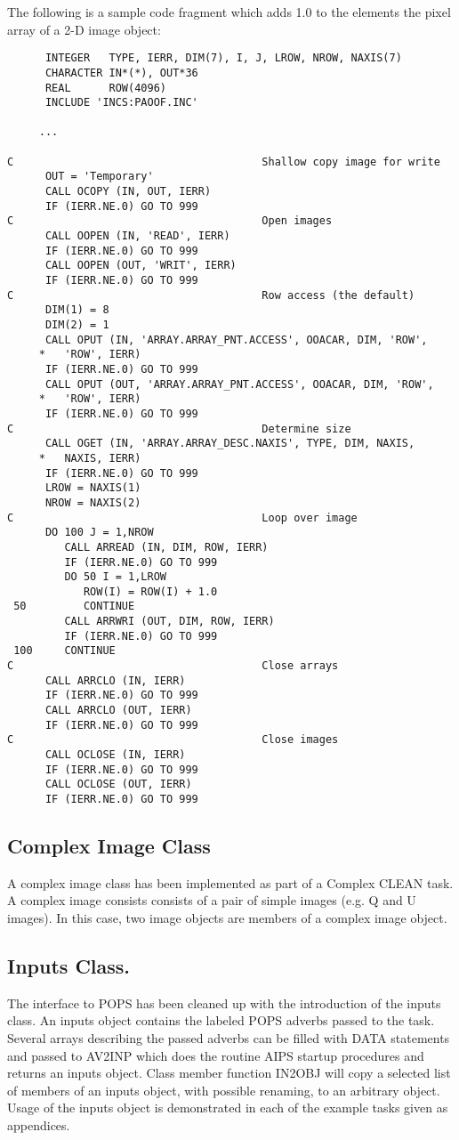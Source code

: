    The following is a sample code fragment which adds 1.0 to the
elements the pixel array of a 2-D image object:
{\small\begin{verbatim}
      INTEGER   TYPE, IERR, DIM(7), I, J, LROW, NROW, NAXIS(7)
      CHARACTER IN*(*), OUT*36
      REAL      ROW(4096)
      INCLUDE 'INCS:PAOOF.INC'

     ...

C                                       Shallow copy image for write
      OUT = 'Temporary'
      CALL OCOPY (IN, OUT, IERR)
      IF (IERR.NE.0) GO TO 999
C                                       Open images
      CALL OOPEN (IN, 'READ', IERR)
      IF (IERR.NE.0) GO TO 999
      CALL OOPEN (OUT, 'WRIT', IERR)
      IF (IERR.NE.0) GO TO 999
C                                       Row access (the default)
      DIM(1) = 8
      DIM(2) = 1
      CALL OPUT (IN, 'ARRAY.ARRAY_PNT.ACCESS', OOACAR, DIM, 'ROW',
     *   'ROW', IERR)
      IF (IERR.NE.0) GO TO 999
      CALL OPUT (OUT, 'ARRAY.ARRAY_PNT.ACCESS', OOACAR, DIM, 'ROW',
     *   'ROW', IERR)
      IF (IERR.NE.0) GO TO 999
C                                       Determine size
      CALL OGET (IN, 'ARRAY.ARRAY_DESC.NAXIS', TYPE, DIM, NAXIS,
     *   NAXIS, IERR)
      IF (IERR.NE.0) GO TO 999
      LROW = NAXIS(1)
      NROW = NAXIS(2)
C                                       Loop over image
      DO 100 J = 1,NROW
         CALL ARREAD (IN, DIM, ROW, IERR)
         IF (IERR.NE.0) GO TO 999
         DO 50 I = 1,LROW
            ROW(I) = ROW(I) + 1.0
 50         CONTINUE
         CALL ARRWRI (OUT, DIM, ROW, IERR)
         IF (IERR.NE.0) GO TO 999
 100     CONTINUE
C                                       Close arrays
      CALL ARRCLO (IN, IERR)
      IF (IERR.NE.0) GO TO 999
      CALL ARRCLO (OUT, IERR)
      IF (IERR.NE.0) GO TO 999
C                                       Close images
      CALL OCLOSE (IN, IERR)
      IF (IERR.NE.0) GO TO 999
      CALL OCLOSE (OUT, IERR)
      IF (IERR.NE.0) GO TO 999
\end{verbatim}}


\subsection{Complex Image Class}
   A complex image class has been implemented as part of a
Complex CLEAN task.  A complex image consists
consists of a pair of simple images (e.g. Q and U images).  In this
case, two image objects are members of a complex image object.

\subsection{Inputs Class.}
   The interface to POPS has been cleaned up with the introduction of
the inputs class.  An inputs object contains the labeled POPS adverbs
passed to the task.  Several arrays describing the passed adverbs can
be filled with DATA statements and passed to AV2INP which does the
routine AIPS startup procedures and returns an inputs object.  Class
member function IN2OBJ will copy a selected list of members of an
inputs object, with possible renaming, to an arbitrary object.  Usage
of the inputs object is demonstrated in each of the example tasks
given as appendices.

